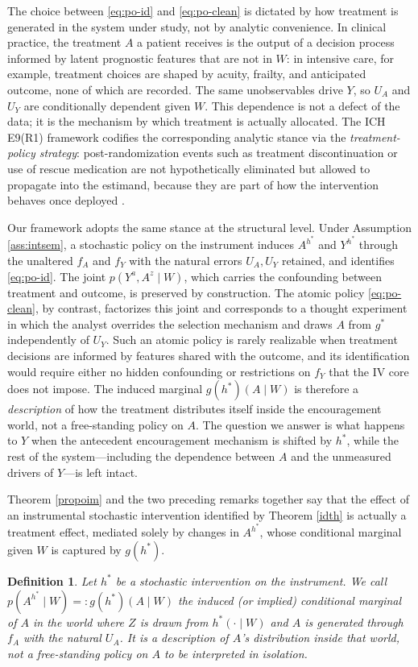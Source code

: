 \documentclass[12pt]{article}
\theoremstyle{thmstyleone}%
\theoremstyle{thmstyletwo}%
\theoremstyle{thmstylethree}%
\newtheorem{defi}{Definition}
\begin{document}
	 { The choice between \eqref{eq:po-id} and \eqref{eq:po-clean} is dictated by how treatment is generated in the system under study, not by analytic convenience. In clinical practice, the treatment $A$ a patient receives is the output of a decision process informed by latent prognostic features that are not in $W$: in intensive care, for example, treatment choices are shaped by acuity, frailty, and anticipated outcome, none of which are recorded. The same unobservables drive $Y$, so $U_A$ and $U_Y$ are conditionally dependent given $W$. This dependence is not a defect of the data; it is the mechanism by which treatment is actually allocated. The ICH E9(R1) framework codifies the corresponding analytic stance via the \emph{treatment-policy strategy}: post-randomization events such as treatment discontinuation or use of rescue medication are not hypothetically eliminated but allowed to propagate into the estimand, because they are part of how the intervention behaves once deployed \citep{ich2019e9r1,wei2025estimands}.}

 {Our framework adopts the same stance at the structural level. Under Assumption \ref{ass:intsem}, a stochastic policy on the instrument induces $A^{h^*}$ and $Y^{h^*}$ through the unaltered $f_A$ and $f_Y$ with the natural errors $U_A, U_Y$ retained, and identifies \eqref{eq:po-id}. The joint $p(Y^a, A^z \mid W)$, which carries the confounding between treatment and outcome, is preserved by construction. The atomic policy \eqref{eq:po-clean}, by contrast, factorizes this joint and corresponds to a thought experiment in which the analyst overrides the selection mechanism and draws $A$ from $g^*$ independently of $U_Y$. Such an atomic policy is rarely realizable when treatment decisions are informed by features shared with the outcome, and its identification would require either no hidden confounding or restrictions on $f_Y$ that the IV core does not impose. The induced marginal $g(h^*)(A \mid W)$ is therefore a \emph{description} of how the treatment distributes itself inside the encouragement world, not a free-standing policy on $A$. The question we answer is what happens to $Y$ when the antecedent encouragement mechanism is shifted by $h^*$, while the rest of the system---including the dependence between $A$ and the unmeasured drivers of $Y$---is left intact.}

	 {Theorem \ref{propoim} and the two preceding remarks together say that} the effect of an instrumental stochastic intervention identified by Theorem \ref{idth} is actually a treatment effect,  {mediated solely by changes in $A^{h^*}$, whose conditional marginal given $W$ is captured by $g(h^*)$}.
	\begin{defi}
Let $h^*$ be a stochastic intervention on the instrument.  {We call $p(A^{h^*}\mid W)=: g(h^*)(A\mid W)$ the \emph{induced} (or \emph{implied}) conditional marginal of $A$ in the world where $Z$ is drawn from $h^*(\cdot\mid W)$ and $A$ is generated through $f_A$ with the natural $U_A$. It is a description of $A$'s distribution inside that world, not a free-standing policy on $A$ to be interpreted in isolation.}
\end{defi}
\end{document}
